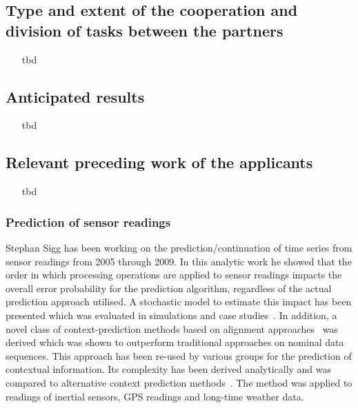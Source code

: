 \documentclass[12pt]{article}
\newcommand{\todoBase}{\hfill \notiz{TODO} $\square$}
\newcommand{\notiz}[1]{\marginpar{\tiny \framebox{\begin{minipage}{2.1cm} #1 \end{minipage}}}}
\newcommand{\todo}{\marginpar{\todoBase}}
\begin{document}


\subsection*{Type and extent of the cooperation and division of tasks between the partners}
\begin{itemize}
 \item[\color{blue}tbd]
\end{itemize}
\subsection*{Anticipated results}
\begin{itemize}
 \item[\color{blue}tbd]
\end{itemize}
\subsection*{Relevant preceding work of the applicants}
\begin{itemize}
 \item[\color{blue}tbd]
\end{itemize}
\subsubsection*{Prediction of sensor readings}
Stephan Sigg has been working on the prediction/continuation of time series from sensor readings from 2005 through 2009. 
In this analytic work he showed that the order in which processing operations are applied to sensor readings impacts the overall error probability for the prediction algorithm, regardless of the actual prediction approach utilised.
A stochastic model to estimate this impact has been presented which was evaluated in simulations and case studies~\cite{4027}. 
In addition, a novel class of context-prediction methods based on alignment approaches~\cite{4026} was derived which was shown to outperform traditional approaches on nominal data sequences. 
This approach has been re-used by various groups for the prediction of contextual information.
Its complexity has been derived analytically and was compared to alternative context prediction methods~\cite{4027}. 
The method was applied to readings of inertial sensors, GPS readings and long-time weather data. 
\end{document}

